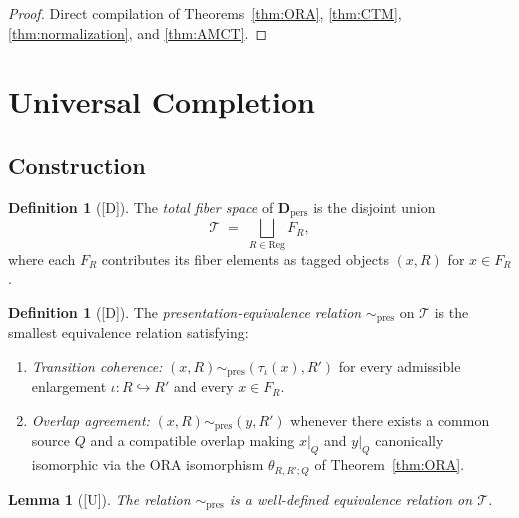 \documentclass[12pt,oneside]{amsbook}
\theoremstyle{plain}
\newtheorem{lemma}[theorem]{Lemma}
\theoremstyle{definition}
\newtheorem{definition}[theorem]{Definition}
\theoremstyle{remark}
\newcommand{\status}[1]{\textup{[#1]}}
\begin{document}
\begin{proof}
Direct compilation of Theorems~\ref{thm:ORA}, \ref{thm:CTM},
\ref{thm:normalization}, and \ref{thm:AMCT}.
\end{proof}

\section{Universal Completion}
\label{sec:universal-completion}

\subsection*{Construction}

\begin{definition}[\status{D}]\label{def:total-fiber}
The \emph{total fiber space} of $\mathbf{D}_{\mathrm{pers}}$ is the
disjoint union
\[
  \mathcal{T} \;=\; \bigsqcup_{R \in \mathrm{Reg}} F_R,
\]
where each $F_R$ contributes its fiber elements as tagged objects
$(x, R)$ for $x \in F_R$.
\end{definition}

\begin{definition}[\status{D}]\label{def:pres-equiv}
The \emph{presentation-equivalence relation} $\sim_{\mathrm{pres}}$ on
$\mathcal{T}$ is the smallest equivalence relation satisfying:
\begin{enumerate}[label=\textup{(E\arabic*)}]
  \item \emph{Transition coherence:} $(x, R) \sim_{\mathrm{pres}}
        (\tau_\iota(x), R')$ for every admissible enlargement $\iota:
        R \hookrightarrow R'$ and every $x \in F_R$.
  \item \emph{Overlap agreement:} $(x, R) \sim_{\mathrm{pres}}
        (y, R')$ whenever there exists a common source $Q$ and a
        compatible overlap making $x|_Q$ and $y|_Q$ canonically
        isomorphic via the ORA isomorphism $\theta_{R,R';Q}$ of
        Theorem~\ref{thm:ORA}.
\end{enumerate}
\end{definition}

\begin{lemma}[\status{U}]\label{lem:pres-equiv-welldef}
The relation $\sim_{\mathrm{pres}}$ is a well-defined equivalence
relation on $\mathcal{T}$.
\end{lemma}
\end{document}
